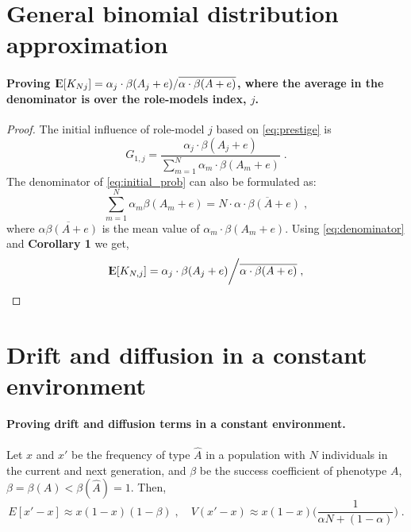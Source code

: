 \documentclass[12pt]{extarticle}
\DeclareMathOperator*{\E}{{\rm I\kern-.3em E}}
\begin{document}
\begin{appendices}
\renewcommand{\theequation}{\thesection\arabic{equation}}

\section{General binomial distribution approximation} \label{sec:GBD}

\paragraph{Proving $\E[K_{Nj}] = \alpha_j \cdot \beta(A_j+e) / \overline{\alpha \cdot \beta(A+e)}$, where the {average} in the denominator is over the role-models index, $j$.}


\begin{proof}
The initial influence of role-model $j$ based on \cref{eq:prestige} is
\begin{equation}\label{eq:initial_prob}
G_{1,j} = \frac{\alpha_j\cdot\beta(A_j+e)}{\sum\limits_{m=1}^{N} \alpha_m\cdot\beta(A_m+e)} \;.
\end{equation}
The denominator of \cref{eq:initial_prob} can also be formulated as:
\begin{equation}\label{eq:denominator}
 \sum\limits_{m=1}^{N}\alpha_m\beta(A_m+e) = N \cdot \overline{\alpha \cdot \beta(A+e)} \;,
\end{equation}
where $\overline{\alpha\beta(A+e)}$ is the mean value of $\alpha_m\cdot\beta(A_m+e)$.
Using \cref{eq:denominator} and \textbf{Corollary 1} we get,
\begin{equation}
\E[K_{N,j}] = \alpha_j \cdot \beta(A_j+e) \bigg/ \overline{\alpha \cdot \beta(A+e)} \;,
\end{equation}
\end{proof}

\section{Drift and diffusion in a constant environment} \label{sec:drift_diff_const}

\paragraph{Proving drift and diffusion terms in a constant environment.}
Let $x$ and $x'$ be the frequency of type $\hat{A}$ in a population with $N$ individuals in the current and next generation, and  $\beta$ {be} the success coefficient of phenotype $A$, $\beta = \beta(A) < \beta(\hat{A}) = 1$.
Then,
\begin{equation*}
E[x'-x] \approx x(1-x)(1-\beta) \;, 
\quad
V(x'-x) \approx x(1-x)\Big(\frac{1}{\alpha N + (1-\alpha)}\Big) \;.
\end{equation*} 



\end{appendices}
\end{document}
